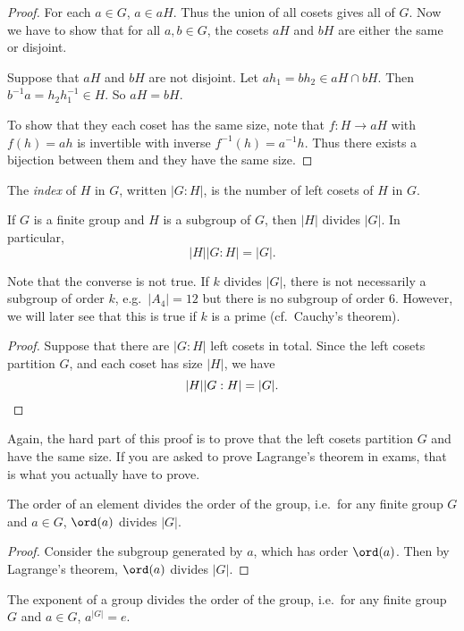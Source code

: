 \documentclass[a4paper]{article}
\begin{document}
\begin{proof}
  For each $a\in G$, $a\in aH$. Thus the union of all cosets gives all of $G$. Now we have to show that for all $a, b\in G$, the cosets $aH$ and $bH$ are either the same or disjoint.

  Suppose that $aH$ and $bH$ are not disjoint. Let $ah_1 = bh_2 \in aH \cap bH$. Then $b^{-1}a = h_2 h_1^{-1}\in H$. So $aH = bH$.

   To show that they each coset has the same size, note that $f: H \to aH$ with $f(h) = ah$ is invertible with inverse $f^{-1}(h) = a^{-1}h$. Thus there exists a bijection between them and they have the same size.
\end{proof}

\begin{defi}
  The \emph{index} of $H$ in $G$, written $|G:H|$, is the number of left cosets of $H$ in $G$.
\end{defi}

\begin{thm}
  If $G$ is a finite group and $H$ is a subgroup of $G$, then $|H|$ divides $|G|$. In particular,
  \[
    |H||G:H| = |G|.
  \]
\end{thm}
Note that the converse is not true. If $k$ divides $|G|$, there is not necessarily a subgroup of order $k$, e.g.\ $|A_4| = 12$ but there is no subgroup of order $6$. However, we will later see that this is true if $k$ is a prime (cf.\ Cauchy's theorem).

\begin{proof}
  Suppose that there are $|G: H|$ left cosets in total. Since the left cosets partition $G$, and each coset has size $|H|$, we have
  \[
    |H||G:H| = |G|.\qedhere
  \]
\end{proof}
Again, the hard part of this proof is to prove that the left cosets partition $G$ and have the same size. If you are asked to prove Lagrange's theorem in exams, that is what you actually have to prove.

\begin{cor}
  The order of an element divides the order of the group, i.e.\ for any finite group $G$ and $a\in G$, $\ord(a)$ divides $|G|$.
\end{cor}
\begin{proof}
  Consider the subgroup generated by $a$, which has order $\ord(a)$. Then by Lagrange's theorem, $\ord(a)$ divides $|G|$.
\end{proof}

\begin{cor}
  The exponent of a group divides the order of the group, i.e.\ for any finite group $G$ and $a\in G$, $a^{|G|} = e$.
\end{cor}
\end{document}
